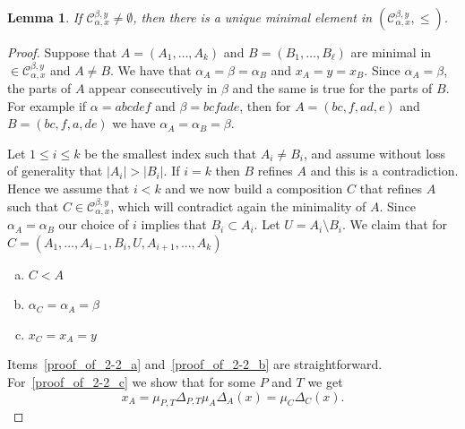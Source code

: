 \documentclass[10pt]{amsart}
\newtheorem{lemma}[theorem]{Lemma}
\theoremstyle{definition}
\begin{document}
\begin{lemma}\label{le:min}
If $\mathcal{C}_{\alpha,x}^{\beta,y}\ne\emptyset$, then there is a unique minimal element in $(\mathcal{C}_{\alpha,x}^{\beta,y},\le)$.
\end{lemma}
\begin{proof} Suppose that $A=(A_1,\ldots,A_k)$ and $B=(B_1,\ldots,B_\ell)$ are minimal in $\in \mathcal{C}_{\alpha,x}^{\beta,y}$ and $A\neq B$. We have that $\alpha_A=\beta=\alpha_B$ and $x_A=y=x_B$. Since $\alpha_A=\beta$, the parts of $A$ appear consecutively in $\beta$ and the same is true for the parts of $B$. For example if $\alpha=abcdef$ and $\beta=bcfade$, then for $A=(bc,f,ad,e)$ and $B=(bc,f,a,de)$ we have $\alpha_A=\alpha_B=\beta$.

 Let $1\le i\le k$ be the smallest index such that $A_i\ne B_i$, and assume without loss of generality that $|A_i|>|B_i|$. If $i=k$ then $B$ refines $A$ and this is a contradiction. Hence we assume that $i<k$ and we now build a composition $C$ that refines $A$ such that $C\in \mathcal{C}_{\alpha,x}^{\beta,y}$, which will contradict again the minimality of $A$. Since $\alpha_A=\alpha_B$ our choice of $i$ implies that $B_i\subset A_i$.
Let $U=A_i\setminus B_i$. We claim that for $C=(A_1,\ldots,A_{i-1},B_i,U,A_{i+1},...,A_k)$
\begin{enumerate}[(a)]
\item %
\label{proof_of_2-2_a} $C<A$ 
\item %
\label{proof_of_2-2_b} $\alpha_C=\alpha_A=\beta$
\item %
\label{proof_of_2-2_c} $x_C=x_A=y$
\end{enumerate}
Items~\ref{proof_of_2-2_a} and~\ref{proof_of_2-2_b} are straightforward. For~\ref{proof_of_2-2_c} we show that for some $P$ and $T$ we get
\begin{equation}\label{eq:xCisxA}
x_A=\mu_{P,T}\Delta_{P,T}\mu_A\Delta_A(x)=\mu_C\Delta_C(x).
\end{equation}


\end{proof}
\end{document}
